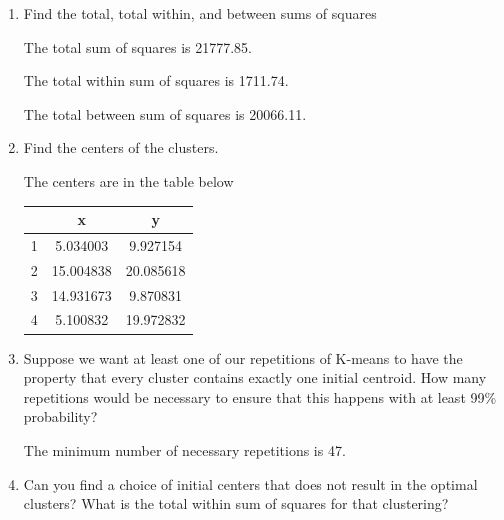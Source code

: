 \documentclass[11pt]{article}
\begin{document}
\begin{enumerate}
\begin{enumerate}
\item 
 Find the total, total within, and between sums of squares

The total sum of squares is 21777.85.

The total within sum of squares is 1711.74.

The total between sum of squares is 20066.11.

\item
 Find the centers of the clusters. 

The centers are in the table below

\begin{center}
\begin{tabular}{|c|c c|}
\hline
    &    x   &     y \\ \hline
1 &  5.034003 &  9.927154 \\
2 & 15.004838 & 20.085618 \\
3 & 14.931673 &  9.870831 \\
4 &  5.100832 & 19.972832 \\
\hline
\end{tabular}
\end{center}

\item 
 Suppose we want at least one of our repetitions of K-means to have 
 the property that every cluster contains exactly one initial centroid. 
 How many repetitions would be necessary to ensure that this happens 
 with at least 99\% probability? 

The minimum number of necessary repetitions is 47. 

\item 
 Can you find a choice of initial centers that does not result in the 
 optimal clusters? What is the total within sum of squares for that 
 clustering? 


\end{enumerate}
\end{enumerate}
\end{document}
